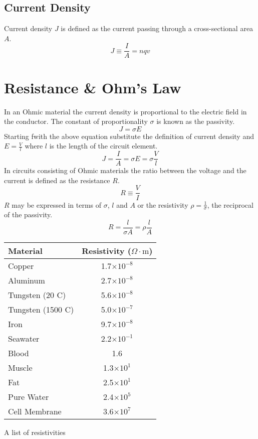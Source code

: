 \subsection{Current Density}
Current density $J$ is defined as the current passing through a cross-sectional area $A$.
$$J \equiv \frac{I}{A}=nqv$$

\section{Resistance \& Ohm's Law}
In an Ohmic material the current density is proportional to the electric field in the conductor.  The constant of proportionality $\sigma$ is known as the passivity.  
$$J=\sigma E$$
Starting fwith the above equation substitute the definition of current density and $E=\frac{V}{l}$ where $l$ is the length of the circuit element.
$$J=\frac{I}{A}=\sigma E=\sigma \frac{V}{l}$$
In circuits consisting of Ohmic materials the ratio between the voltage and the current is defined as the resistance $R$.
$$R\equiv \frac{V}{I}$$
$R$ may be expressed in terms of $\sigma$, $l$ and $A$ or the resistivity $\rho=\frac{1}{\sigma}$, the reciprocal of the passivity.
$$R=\frac{l}{\sigma A}=\rho\frac{l}{A}$$

\begin{margintable}[0pt]
  \footnotesize%
  \begin{center}
    \begin{tabular}{lc}
      \toprule
     Material & Resistivity ($\Omega\cdot \text{m}$) \\
      \midrule
     Copper     & 1.7$\times10^{-8}$  \\
    Aluminum      & 2.7$\times10^{-8}$  \\
    Tungsten (20 C)     & 5.6$\times10^{-8}$  \\
    Tungsten (1500 C)    & 5.0$\times10^{-7}$  \\
    Iron    & 9.7$\times10^{-8}$ \\
    Seawater      & 2.2$\times10^{-1}$  \\
    Blood     & 1.6  \\
    Muscle   & 1.3$\times10^{1}$  \\
    Fat      & 2.5$\times10^{1}$  \\
    Pure Water     & 2.4$\times10^{5}$  \\
    Cell Membrane     & 3.6$\times10^{7}$  \\
      \bottomrule
    \end{tabular}
  \end{center}
  \caption{A list of resistivities}
  \label{tab:font-sizes}
\end{margintable}


